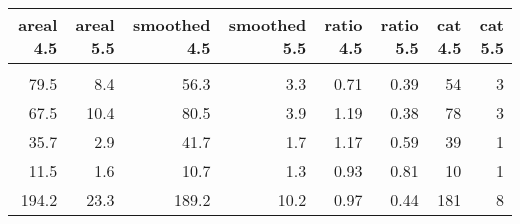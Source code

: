 \begin{tabular}{rrrrrrrr}
\toprule
 areal 4.5 &  areal 5.5 &  smoothed 4.5 &  smoothed 5.5 &  ratio 4.5 &  ratio 5.5 &  cat 4.5 &  cat 5.5 \\
\midrule
           &            &               &               &            &            &          &          \\
      79.5 &        8.4 &          56.3 &           3.3 &       0.71 &       0.39 &       54 &        3 \\
      67.5 &       10.4 &          80.5 &           3.9 &       1.19 &       0.38 &       78 &        3 \\
      35.7 &        2.9 &          41.7 &           1.7 &       1.17 &       0.59 &       39 &        1 \\
      11.5 &        1.6 &          10.7 &           1.3 &       0.93 &       0.81 &       10 &        1 \\
     194.2 &       23.3 &         189.2 &          10.2 &       0.97 &       0.44 &      181 &        8 \\
\bottomrule
\end{tabular}
